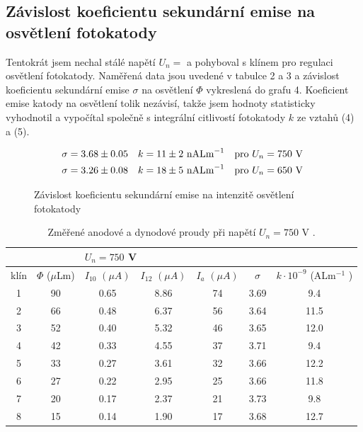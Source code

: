 \documentclass[a4paper,11pt]{article}
\begin{document}
\subsection{Závislost koeficientu sekundární emise na osvětlení fotokatody}
                   
Tentokrát jsem nechal stálé napětí $ U_n = $ a pohyboval s klínem pro regulaci osvětlení fotokatody. Naměřená data jsou uvedené v tabulce 2 a 3 a závislost koeficientu sekundární emise $ \sigma $  na osvětlení $ \Phi $ vykreslená do grafu 4. Koeficient emise katody na osvětlení tolik nezávisí, takže jsem hodnoty statisticky vyhodnotil a vypočítal společně s integrální citlivostí fotokatody $ k $ ze vztahů (4) a (5).

\begin{align*}
    \sigma &= 3.68 \pm 0.05 && k = 11 \pm 2 \text{ nALm}  ^{-1} && \text{pro $ U_n = 750 $ V} \\
    \sigma &= 3.26 \pm 0.08 && k = 18 \pm 5 \text{ nALm}^{-1} && \text{pro $ U_n = 650 $ V }
\end{align*}

\begin{figure}[htpb]
    \centering
    
    \captionsetup{type=graph}
    \caption{Závislost koeficientu sekundární emise na intenzitě osvětlení fotokatody}
\end{figure} 

\begin{table}[htpb]
    \centering
    \begin{tabular}{| c c | c c c c c |}
        \hline
        \multicolumn{2}{|l|}{} & \multicolumn{5}{l|}{$ U_n = 750 $ V} \\\hline
        klín & $ \Phi $ ($ \mu $Lm) & $ I_{10} $ $ (\mu A) $  & $ I_{12} $ $ (\mu A) $ & $ I_a $ $ (\mu A) $ & $ \sigma $ & $ k \cdot 10^{-9} $ (ALm$^{-1}  $ )  \\ \hline
        1 & 90 & 0.65 & 8.86 & 74 & 3.69 &  9.4 \\
        2 & 66 & 0.48 & 6.37 & 56 & 3.64 & 11.5 \\
        3 & 52 & 0.40 & 5.32 & 46 & 3.65 & 12.0 \\
        4 & 42 & 0.33 & 4.55 & 37 & 3.71 &  9.4 \\
        5 & 33 & 0.27 & 3.61 & 32 & 3.66 & 12.2 \\
        6 & 27 & 0.22 & 2.95 & 25 & 3.66 & 11.8 \\
        7 & 20 & 0.17 & 2.37 & 21 & 3.73 &  9.8 \\
        8 & 15 & 0.14 & 1.90 & 17 & 3.68 & 12.7 \\
        \hline
    \end{tabular}
    \caption{Změřené anodové a dynodové proudy při napětí $ U_n = 750 $ V .}
\end{table}
\end{document}
